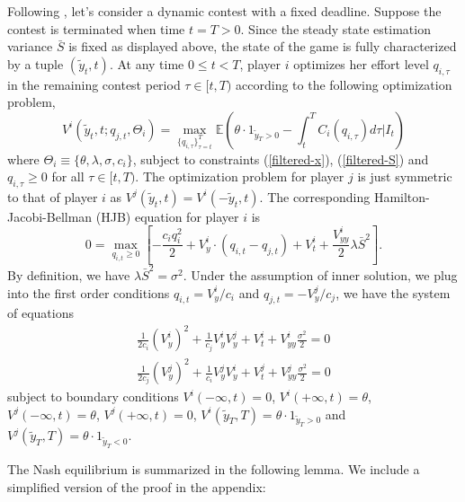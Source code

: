 \documentclass[mnsc]{informs3}
\begin{document}
Following \cite{Ryvkin2022Fight}, let's consider a dynamic contest with a fixed deadline. 
Suppose the contest is terminated when time $t=T>0$. 
Since the steady state estimation variance $\bar{S}$ is fixed as displayed above, the state of the game is fully characterized by a tuple $(\tilde{y}_t, t)$. 
At any time $0\le t<T$, player $i$ optimizes her effort level $q_{i,\tau}$ in the remaining contest period $\tau\in[t, T)$ according to the following optimization problem, 
\begin{equation}\label{v-def}
	V^i(\tilde{y}_{t}, t ; q_{j,t},\Theta_i) = \max_{\{q_{i,\tau}\}^T_{\tau=t}} 
	\mathbb{E}\left( \theta\cdot1_{\tilde{y}_T>0} - \int^T_tC_i(q_{i,\tau})d\tau \bigg|I_t\right) 
\end{equation}
where $\Theta_i \equiv\{\theta, \lambda, \sigma, c_i\}$, subject to constraints (\ref{filtered-x}), (\ref{filtered-S}) and $q_{i,\tau}\ge0$ for all $\tau\in[t,T)$.
The optimization problem for player $j$ is just symmetric to that of player $i$ as $V^j(\tilde{y}_t, t) = V^i(-\tilde{y}_t, t)$. 
The corresponding Hamilton-Jacobi-Bellman (HJB) equation for player $i$ is 
\begin{equation*}
0 = \max_{q_{i,t}\ge0}\left[-\frac{c_iq_i^2}{2} + V^i_{y}\cdot\left(q_{i,t}-q_{j,t}\right)+V^i_t + \frac{V^i_{yy}}{2}\lambda \bar{S}^2\right].
\end{equation*}
By definition, we have $\lambda \bar{S}^2 = \sigma^2$. 
Under the assumption of inner solution, we plug into the first order conditions $q_{i,t} = V^i_y/c_i$ and $q_{j,t} = -V^j_y/c_j$, we have the system of equations
\begin{equation*}
\begin{aligned}
\frac{1}{2c_i}(V^i_y)^2 + \frac{1}{c_j}V^i_yV^j_y + V^i_t + V^i_{yy}\frac{\sigma^2}{2} = 0\\
\frac{1}{2c_j}(V^j_y)^2 + \frac{1}{c_i}V^j_yV^i_y + V^j_t + V^j_{yy}\frac{\sigma^2}{2} = 0
\end{aligned}
\end{equation*}
subject to boundary conditions $V^i(-\infty, t) = 0$, $V^i(+\infty, t) = \theta$, $V^j(-\infty, t) = \theta$, $V^j(+\infty, t)=0$, $V^i(\tilde{y}_T, T) = \theta \cdot 1_{\tilde{y}_T > 0}$ and $V^j(\tilde{y}_T, T) = \theta \cdot 1_{\tilde{y}_T < 0}$. 


The Nash equilibrium is summarized in the following lemma. 
We include a simplified version of the proof in the appendix: 
\end{document}
